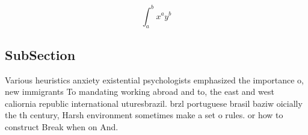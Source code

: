 \documentclass[a4paper]{article}
\begin{document}
\[ \int_{a}^{b}{x^{a}y^{b}} \]

\subsection{SubSection}

Various heuristics anxiety existential psychologists emphasized the importance o, new immigrants To mandating working abroad and to, the east and west caliornia republic international uturesbrazil. brzl portuguese brasil baziw oicially the th century, Harsh environment sometimes make a set o rules. or how to construct Break when on And. 
\end{document}
